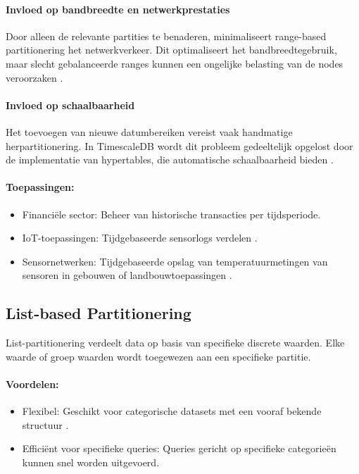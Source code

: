 \paragraph{Invloed op bandbreedte en netwerkprestaties} 
Door alleen de relevante partities te benaderen, minimaliseert range-based partitionering het netwerkverkeer. Dit optimaliseert het bandbreedtegebruik, maar slecht gebalanceerde ranges kunnen een ongelijke belasting van de nodes veroorzaken \autocite{Ponnusamy2024}.

\paragraph{Invloed op schaalbaarheid} 
Het toevoegen van nieuwe datumbereiken vereist vaak handmatige herpartitionering. In TimescaleDB wordt dit probleem gedeeltelijk opgelost door de implementatie van hypertables, die automatische schaalbaarheid bieden \autocite{TimescaleDBDocumentation}.

\paragraph{Toepassingen:}
\begin{itemize}
    \item Financiële sector: Beheer van historische transacties per tijdsperiode.
    \item IoT-toepassingen: Tijdgebaseerde sensorlogs verdelen \autocite{Ponnusamy2024}.
    \item Sensornetwerken: Tijdgebaseerde opslag van temperatuurmetingen van sensoren in gebouwen of landbouwtoepassingen \autocite{Mahmud2020}.
\end{itemize}
 
\subsection{List-based Partitionering}
List-partitionering verdeelt data op basis van specifieke discrete waarden. Elke waarde of groep waarden wordt toegewezen aan een specifieke partitie.
 
\paragraph{Voordelen:}
\begin{itemize}
    \item Flexibel: Geschikt voor categorische datasets met een vooraf bekende structuur \autocite{Mahmud2020}.
    \item Efficiënt voor specifieke queries: Queries gericht op specifieke categorieën kunnen snel worden uitgevoerd.
\end{itemize}
 
